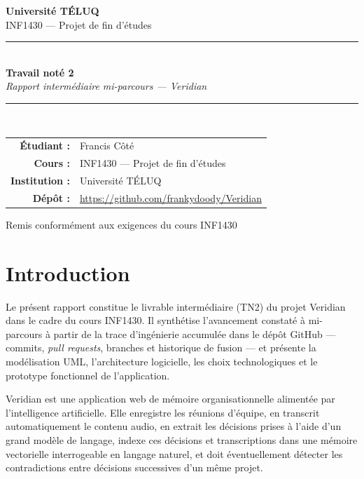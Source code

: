 \documentclass[12pt, a4paper]{article}
\begin{document}
\begin{titlepage}
  \centering
  \vspace*{2cm}

  {\Large \textbf{Université TÉLUQ}}\\[0.5cm]
  {\large INF1430 — Projet de fin d'études}\\[3cm]

  \rule{\linewidth}{0.5pt}\\[0.4cm]
  {\LARGE \textbf{Travail noté 2}}\\[0.3cm]
  {\Large \textit{Rapport intermédiaire mi-parcours — Veridian}}\\[0.3cm]
  \rule{\linewidth}{0.5pt}\\[3cm]

  \begin{tabular}{rl}
    \textbf{Étudiant :}    & Francis Côté \\[0.3cm]
    \textbf{Cours :}       & INF1430 — Projet de fin d'études \\[0.3cm]
    \textbf{Institution :} & Université TÉLUQ \\[0.3cm]
    \textbf{Dépôt :}       & \url{https://github.com/frankydoody/Veridian} \\[0.3cm]
  \end{tabular}

  \vfill
  {\small Remis conformément aux exigences du cours INF1430}
\end{titlepage}

\newpage
\tableofcontents
\newpage

\section{Introduction}

Le présent rapport constitue le livrable intermédiaire (TN2) du projet Veridian dans le cadre du cours INF1430. Il synthétise l'avancement constaté à mi-parcours à partir de la trace d'ingénierie accumulée dans le dépôt GitHub — commits, \textit{pull requests}, branches et historique de fusion — et présente la modélisation UML, l'architecture logicielle, les choix technologiques et le prototype fonctionnel de l'application.

Veridian est une application web de mémoire organisationnelle alimentée par l'intelligence artificielle. Elle enregistre les réunions d'équipe, en transcrit automatiquement le contenu audio, en extrait les décisions prises à l'aide d'un grand modèle de langage, indexe ces décisions et transcriptions dans une mémoire vectorielle interrogeable en langage naturel, et doit éventuellement détecter les contradictions entre décisions successives d'un même projet.
\end{document}
